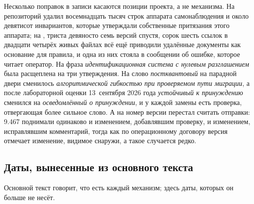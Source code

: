 Несколько поправок в записи касаются позиции проекта, а не механизма. На  репозиторий
удалил восемнадцать тысяч строк аппарата самонаблюдения и около девятисот инвариантов, которые
утверждали собственные притязания этого аппарата; на , триста девяносто семь версий
спустя, сорок шесть ссылок в двадцати четырёх живых файлах всё ещё приводили удалённые документы
как основание для правила, и одна из них стояла в сообщении об ошибке, которое читает оператор. На
 фраза \emph{идентификационная система с нулевым разглашением} была расщеплена на три
утверждения. На  слово \emph{постквантовый} на парадной двери сменилось
\emph{алгоритмической гибкостью при проверяемом пути миграции}, а после лабораторной оценки
13~сентября 2026 года \emph{устойчивый к принуждению} сменился на \emph{осведомлённый о
принуждении}, и у каждой замены есть проверка, отвергающая более сильное слово. А на
 номер версии перестал считать отправки: 9.467 поднимали одинаково и изменением,
добавлявшим проверку, и изменением, исправлявшим комментарий, тогда как по операционному договору
версия отмечает изменение, видимое снаружи, а такое случается редко.

\subsection*{Даты, вынесенные из основного текста}

Основной текст говорит, что есть каждый механизм; здесь даты, которых он больше не несёт.

